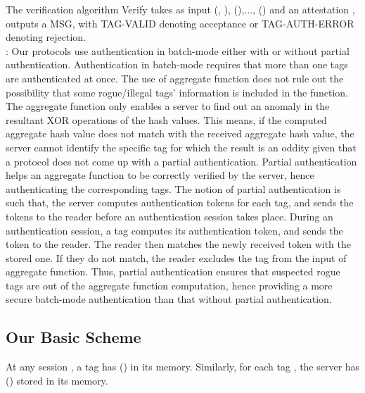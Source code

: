\documentclass{easychair}
\begin{document}
The verification algorithm Verify takes as input (, ),
(),..., () and an attestation , outputs a MSG, 
with TAG-VALID denoting acceptance or TAG-AUTH-ERROR denoting rejection.\\
: Our protocols use authentication in batch-mode either with or without partial authentication. Authentication in batch-mode requires that more than one tags are authenticated at once. The use of aggregate function does not rule out the possibility that some rogue/illegal tags' information is included in the function. The aggregate function only enables a server to find out an anomaly in the 
resultant XOR operations of the hash values. This means, if the computed 
aggregate hash value does not match with the received aggregate hash value, the server cannot 
identify the specific tag for which the result is an oddity given that a protocol does not come up with a partial authentication. Partial authentication helps an aggregate function to be correctly 
verified by the server, hence authenticating the corresponding tags. The notion of partial authentication is such that, the server computes authentication tokens for each tag, and sends the tokens to the reader before an authentication session takes place. During an authentication session, a tag computes its authentication token, and sends the token to the reader. The reader then matches the newly received token with the stored one. If they do not match, the reader excludes the tag from the input of aggregate function. Thus, partial authentication ensures that suspected rogue tags are out of the aggregate function computation, hence providing a more secure batch-mode authentication than that without partial authentication.


\subsection{Our Basic Scheme}

At any session , a tag  has () in its memory. Similarly, for each tag , the server has () stored in its memory.
\end{document}
